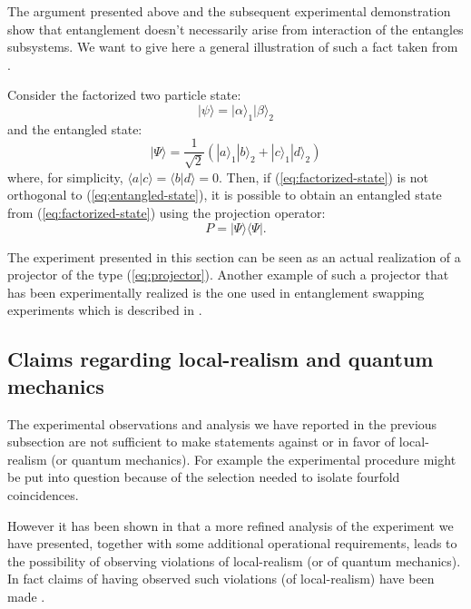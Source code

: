 \begin{observation}
  The argument presented above and the subsequent experimental demonstration show that entanglement doesn't necessarily arise from interaction of the entangles subsystems. We want to give here a general illustration of such a fact taken from \cite{NYAS:NYAS91}.

Consider the factorized two particle state:
\begin{equation}
  |\psi\rangle = |\alpha\rangle_1 |\beta\rangle_2
  \label{eq:factorized-state}
\end{equation}
and the entangled state:
\begin{equation}
  |\Psi\rangle = \frac{1}{\sqrt{2}} \left( |a\rangle_1 |b\rangle_2 + |c\rangle_1 |d\rangle_2\right)
  \label{eq:entangled-state}
\end{equation}
where, for simplicity, $\langle a | c \rangle = \langle b | d \rangle = 0$.
Then, if (\ref{eq:factorized-state}) is not orthogonal to (\ref{eq:entangled-state}), it is possible to obtain an entangled state from (\ref{eq:factorized-state}) using the projection operator:
\begin{equation}
  P = |\Psi\rangle \langle\Psi|.
  \label{eq:projector}
\end{equation}

The experiment presented in this section can be seen as an actual realization of a projector of the type (\ref{eq:projector}). Another example of such a projector that has been experimentally realized is the one used in entanglement swapping experiments which is described in \cite{NYAS:NYAS91}.
\end{observation}



\subsection{Claims regarding local-realism and quantum mechanics}
The experimental observations and analysis we have reported in the previous subsection are not sufficient to make statements against or in favor of local-realism (or quantum mechanics). For example the experimental procedure might be put into question because of the selection needed to isolate fourfold coincidences.

However it has been shown in \cite{PhysRevA.61.022109} that a more refined analysis of the experiment we have presented, together with some additional operational requirements, leads to the possibility of observing violations of local-realism (or of quantum mechanics). In fact claims of having observed such violations (of local-realism) have been made \cite{Nature.403.515}.

